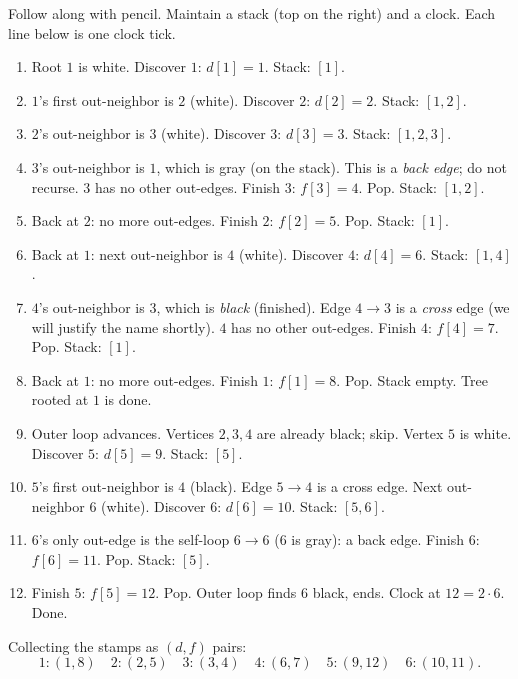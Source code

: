 \begin{labbox}
Follow along with pencil. Maintain a stack (top on the right) and a clock. Each line below is one clock tick.
\begin{enumerate}\itemsep0.15em
  \item Root $1$ is white. Discover $1$: $d[1]=1$. Stack: $[1]$.
  \item $1$'s first out-neighbor is $2$ (white). Discover $2$: $d[2]=2$. Stack: $[1,2]$.
  \item $2$'s out-neighbor is $3$ (white). Discover $3$: $d[3]=3$. Stack: $[1,2,3]$.
  \item $3$'s out-neighbor is $1$, which is gray (on the stack). This is a \emph{back edge}; do not recurse. $3$ has no other out-edges. Finish $3$: $f[3]=4$. Pop. Stack: $[1,2]$.
  \item Back at $2$: no more out-edges. Finish $2$: $f[2]=5$. Pop. Stack: $[1]$.
  \item Back at $1$: next out-neighbor is $4$ (white). Discover $4$: $d[4]=6$. Stack: $[1,4]$.
  \item $4$'s out-neighbor is $3$, which is \emph{black} (finished). Edge $4\to3$ is a \emph{cross} edge (we will justify the name shortly). $4$ has no other out-edges. Finish $4$: $f[4]=7$. Pop. Stack: $[1]$.
  \item Back at $1$: no more out-edges. Finish $1$: $f[1]=8$. Pop. Stack empty. Tree rooted at $1$ is done.
  \item Outer loop advances. Vertices $2,3,4$ are already black; skip. Vertex $5$ is white. Discover $5$: $d[5]=9$. Stack: $[5]$.
  \item $5$'s first out-neighbor is $4$ (black). Edge $5\to4$ is a cross edge. Next out-neighbor $6$ (white). Discover $6$: $d[6]=10$. Stack: $[5,6]$.
  \item $6$'s only out-edge is the self-loop $6\to6$ ($6$ is gray): a back edge. Finish $6$: $f[6]=11$. Pop. Stack: $[5]$.
  \item Finish $5$: $f[5]=12$. Pop. Outer loop finds $6$ black, ends. Clock at $12=2\cdot 6$. Done.
\end{enumerate}
\end{labbox}

Collecting the stamps as $(d,f)$ pairs:
\[
1{:}(1,8)\quad 2{:}(2,5)\quad 3{:}(3,4)\quad 4{:}(6,7)\quad 5{:}(9,12)\quad 6{:}(10,11).
\]


